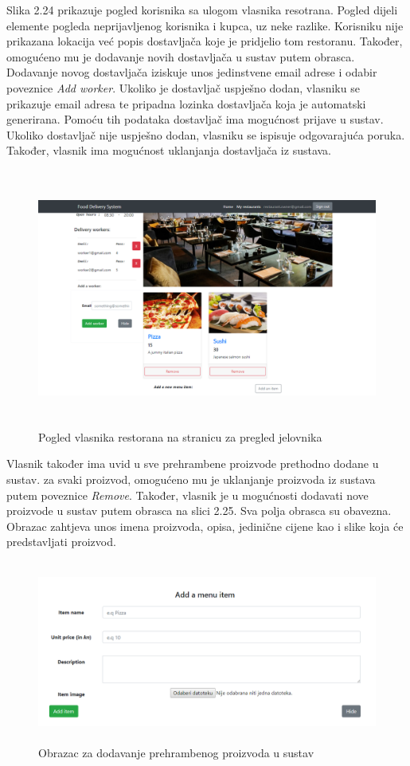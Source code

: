 \documentclass[times, utf8, zavrsni, numeric]{fer}
\begin{document}
Slika 2.24 prikazuje pogled korisnika sa ulogom vlasnika resotrana. Pogled dijeli elemente pogleda neprijavljenog korisnika i kupca, uz neke razlike. Korisniku nije prikazana lokacija već popis dostavljača koje je pridjelio tom restoranu. Također, omogućeno mu je dodavanje novih dostavljača u sustav putem obrasca. Dodavanje novog dostavljača iziskuje unos jedinstvene email adrese i odabir poveznice \emph{Add worker}. Ukoliko je dostavljač uspješno dodan, vlasniku se prikazuje email adresa te pripadna lozinka dostavljača koja je automatski generirana. Pomoću tih podataka dostavljač ima mogućnost prijave u sustav. Ukoliko dostavljač nije uspješno dodan, vlasniku se ispisuje odgovarajuća poruka. Također, vlasnik ima mogućnost uklanjanja dostavljača iz sustava.
\begin{figure}[htb]
\centering
\includegraphics[height=8.5cm]{jelovnikVlasnik.png}
\caption{Pogled vlasnika restorana na stranicu za pregled jelovnika}
\label{fig:peerRest}
\end{figure}

Vlasnik također ima uvid u sve prehrambene proizvode prethodno dodane u sustav. za svaki proizvod, omogućeno mu je uklanjanje proizvoda iz sustava putem poveznice \emph{Remove}. Također, vlasnik je u mogućnosti dodavati nove proizvode u sustav putem obrasca na slici 2.25. Sva polja obrasca su obavezna. Obrazac zahtjeva unos imena proizvoda, opisa, jedinične cijene kao i slike koja će predstavljati proizvod.
\begin{figure}[htb]
\centering
\includegraphics[height=6cm]{obrazacJelo.png}
\caption{Obrazac za dodavanje prehrambenog proizvoda u sustav}
\label{fig:obrJel}
\end{figure}  
\end{document}
